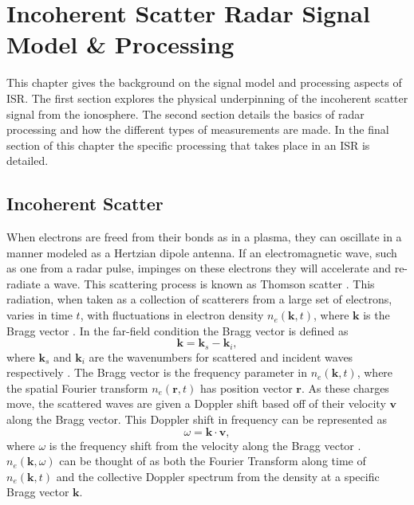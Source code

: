 \chapter{Incoherent Scatter Radar Signal Model \& Processing}
\label{chapter:isrproc}
\thispagestyle{myheadings}

\graphicspath{{2_ISRProc/Figures/}}


This chapter gives the background on the signal model and processing aspects of ISR. The first section explores the physical  underpinning of the incoherent scatter signal from the ionosphere. The second section details the basics of radar processing and how the different types of measurements are made. In the final section of this chapter the specific processing that takes place in an ISR is detailed.

\section{Incoherent Scatter}
\label{sec:incohscat}
When electrons are freed from their bonds as in a plasma, they can oscillate in a manner modeled as a Hertzian dipole antenna. If an electromagnetic wave, such as one from a radar pulse, impinges on these electrons they will accelerate and re-radiate a wave. This scattering process is known as Thomson scatter \citep{Hutchinson_2002}. This radiation, when taken as a collection of scatterers from a large set of electrons, varies in time $t$, with fluctuations in electron density $n_e(\mathbf{k},t)$, where $\mathbf{k}$ is the Bragg vector \citep{kudeki:milla:1}. In the far-field condition the Bragg vector is defined as
\begin{equation}
\label{eqn:bragg}
\mathbf{k}=\mathbf{k}_s-\mathbf{k}_i,
\end{equation}
where $\mathbf{k}_s$ and $\mathbf{k}_i$ are the wavenumbers for scattered and incident waves respectively \citep{sheffield2010}. The Bragg vector is the frequency parameter in $n_e(\mathbf{k},t)$, where the spatial Fourier transform $n_e(\mathbf{r},t)$ has position vector $\mathbf{r}$. As these charges move, the scattered waves are given a Doppler shift based off of their velocity $\mathbf{v}$ along the Bragg vector. This Doppler shift in frequency can be represented as
\begin{equation}
\label{eqn:dop1}
\omega=\mathbf{k} \cdot \mathbf{v},
\end{equation}
where $\omega$ is the frequency shift from the velocity along the Bragg vector \citep{sheffield2010}. $n_e(\mathbf{k}, \omega)$ can be thought of as both the Fourier Transform along time of $n_e(\mathbf{k},t)$ and the collective Doppler spectrum from the density at a specific Bragg vector $\mathbf{k}$.


